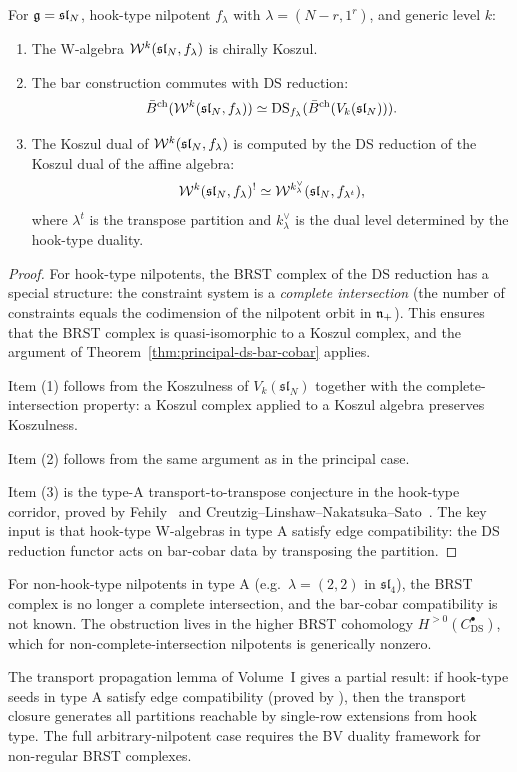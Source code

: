 \begin{theorem}
For $\mathfrak{g} = \mathfrak{sl}_N$, hook-type nilpotent $f_\lambda$ with
$\lambda = (N-r, 1^r)$, and generic level $k$:
\begin{enumerate}
\item The W-algebra $\mathcal{W}^k(\mathfrak{sl}_N, f_\lambda)$ is chirally
 Koszul.
\item The bar construction commutes with DS reduction:
 \[
 \bar{B}^{\mathrm{ch}}(\mathcal{W}^k(\mathfrak{sl}_N, f_\lambda))
 \simeq
 \mathrm{DS}_{f_\lambda}(\bar{B}^{\mathrm{ch}}(V_k(\mathfrak{sl}_N))).
 \]
\item The Koszul dual of $\mathcal{W}^k(\mathfrak{sl}_N, f_\lambda)$ is
 computed by the DS reduction of the Koszul dual of the affine
 algebra:
 \[
 \mathcal{W}^k(\mathfrak{sl}_N, f_\lambda)^!
 \simeq
 \mathcal{W}^{k^\vee_\lambda}(\mathfrak{sl}_N, f_{\lambda^t}),
 \]
 where $\lambda^t$ is the transpose partition and $k^\vee_\lambda$ is
 the dual level determined by the hook-type duality.
\end{enumerate}
\end{theorem}

\begin{proof}
For hook-type nilpotents, the BRST complex of the DS reduction has a
special structure: the constraint system is a \emph{complete
intersection} (the number of constraints equals the codimension of
the nilpotent orbit in $\mathfrak{n}_+$). This ensures that the BRST complex
is quasi-isomorphic to a Koszul complex, and the argument of
Theorem~\ref{thm:principal-ds-bar-cobar} applies.

Item (1) follows from the Koszulness of $V_k(\mathfrak{sl}_N)$
together with the complete-intersection property: a Koszul
complex applied to a Koszul algebra preserves Koszulness.

Item (2) follows from the same argument as in the principal case.

Item (3) is the type-A transport-to-transpose conjecture in the
hook-type corridor, proved by Fehily~\cite{Feh23} and
Creutzig--Linshaw--Nakatsuka--Sato~\cite{CLNS25}. The key input is
that hook-type W-algebras in type A satisfy edge compatibility: the
DS reduction functor acts on bar-cobar data by transposing the
partition.
\end{proof}

\begin{remark}
For non-hook-type nilpotents in type A (e.g.\ $\lambda = (2,2)$ in
$\mathfrak{sl}_4$), the BRST complex is no longer a complete
intersection, and the bar-cobar compatibility is not known. The
obstruction lives in the higher BRST cohomology $H^{>0}(C^\bullet_{\mathrm{DS}})$,
which for non-complete-intersection nilpotents is generically nonzero.

The transport propagation lemma of Volume~I gives a partial result:
if hook-type seeds in type A satisfy edge compatibility (proved by
\cite{CLNS25}), then the transport closure generates all partitions
reachable by single-row extensions from hook type. The full
arbitrary-nilpotent case requires the BV duality framework for non-regular
BRST complexes.
\end{remark}


